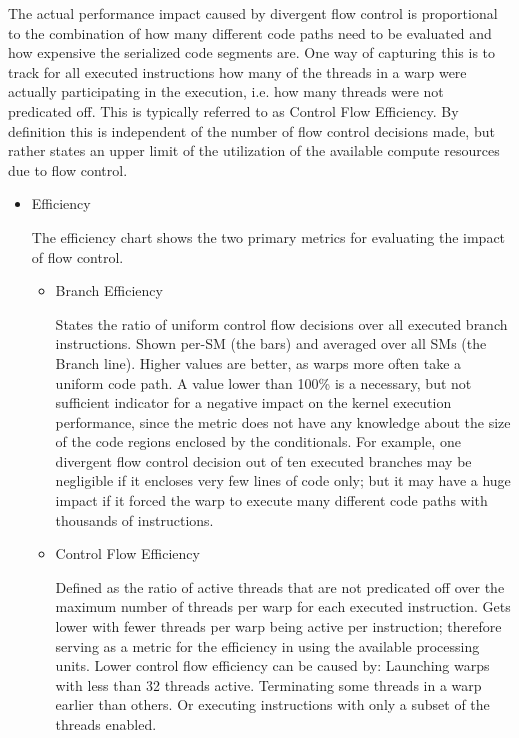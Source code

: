 \documentclass[oneside,openright,12pt,final,en]{mgr}
\begin{document}
The actual performance impact caused by divergent flow control is proportional to the combination of how many different code paths need to be evaluated and how expensive the serialized code segments are. One way of capturing this is to track for all executed instructions how many of the threads in a warp were actually participating in the execution, i.e. how many threads were not predicated off. This is typically referred to as Control Flow Efficiency. By definition this is independent of the number of flow control decisions made, but rather states an upper limit of the utilization of the available compute resources due to flow control.


\begin{itemize}
	\item Efficiency
		
	The efficiency chart shows the two primary metrics for evaluating the impact of flow control.
	
	\begin{itemize}
		\item Branch Efficiency
		
		 States the ratio of uniform control flow decisions over all executed branch instructions. Shown per-SM (the bars) and averaged over all SMs (the Branch line). Higher values are better, as warps more often take a uniform code path. A value lower than 100\% is a necessary, but not sufficient indicator for a negative impact on the kernel execution performance, since the metric does not have any knowledge about the size of the code regions enclosed by the conditionals. For example, one divergent flow control decision out of ten executed branches may be negligible if it encloses very few lines of code only; but it may have a huge impact if it forced the warp to execute many different code paths with thousands of instructions.
		 
		 \item Control Flow Efficiency
		 
		  Defined as the ratio of active threads that are not predicated off over the maximum number of threads per warp for each executed instruction. Gets lower with fewer threads per warp being active per instruction; therefore serving as a metric for the efficiency in using the available processing units. Lower control flow efficiency can be caused by: Launching warps with less than 32 threads active. Terminating some threads in a warp earlier than others. Or executing instructions with only a subset of the threads enabled.
	\end{itemize}


\end{itemize}
\end{document}
